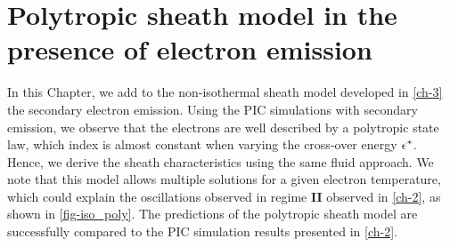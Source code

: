 



\chapter{Polytropic sheath model in the presence of electron emission}
\label{ch-4}


\begin{Chabstract}
  
In this Chapter, we add to the non-isothermal sheath model developed in \cref{ch-3} the secondary electron emission.
Using the \ac{PIC} simulations with secondary emission, we observe that the electrons are well described by a polytropic state law, which index is almost constant when varying the cross-over energy $\epsilon^{*}$.
Hence, we derive the sheath characteristics using the same fluid approach.
We note that this model allows multiple solutions for a given electron temperature, which could explain the oscillations observed in regime {\bf II} observed in \cref{ch-2}, as shown in \cref{fig-iso_poly}.
The predictions of the polytropic sheath model are successfully compared to the \ac{PIC} simulation results presented in \cref{ch-2}.
\end{Chabstract}

% 
% 
% 
% 
% 

